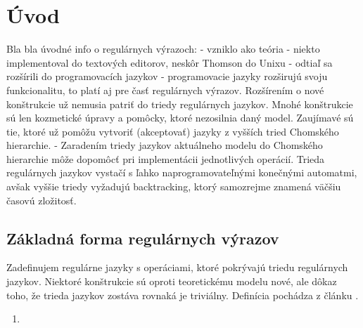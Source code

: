 {}
{}
\chapter*{Úvod}\label{chap:intro}

Bla bla úvodné info o regulárnych výrazoch:
- vzniklo ako teória
- niekto implementoval do textových editorov, neskôr Thomson do Unixu
- odtiaľ sa rozšírili do programovacích jazykov
- programovacie jazyky rozširujú svoju funkcionalitu, to platí aj pre časť regulárnych výrazov. Rozšírením o nové konštrukcie už nemusia patriť do triedy regulárnych jazykov. Mnohé konštrukcie sú len kozmetické úpravy a pomôcky, ktoré nezosilnia daný model. Zaujímavé sú tie, ktoré už pomôžu vytvoriť (akceptovať) jazyky z vyšších tried Chomského hierarchie.
- Zaradením triedy jazykov aktuálneho modelu do Chomského hierarchie môže dopomôcť pri implementácii jednotlivých operácií. Trieda regulárnych jazykov vystačí s ľahko naprogramovateľnými konečnými automatmi, avšak vyššie triedy vyžadujú backtracking, ktorý samozrejme znamená väčšiu časovú zložitosť.

\section{Základná forma regulárnych výrazov}\label{chap:zaklad}

Zadefinujem regulárne jazyky s operáciami, ktoré pokrývajú triedu regulárnych jazykov. Niektoré konštrukcie sú oproti teoretickému modelu nové, ale dôkaz toho, že trieda jazykov zostáva rovnaká je triviálny. Definícia pochádza z článku \cite{ExtendedRegexPower}.

\begin{enumerate}
\item
\end{enumerate}
